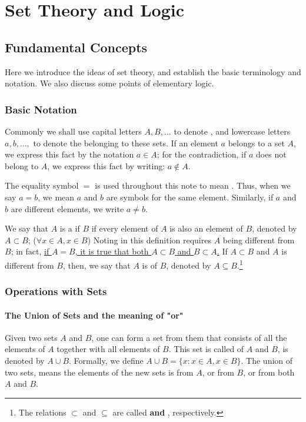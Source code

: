 \section{Set Theory and Logic}

\subsection{Fundamental Concepts}

Here we introduce the ideas of set theory, and establish the basic terminology and notation. We also discuss some points of elementary logic.

\subsubsection{Basic Notation}

Commonly we shall use capital letters $A, B, \dots$ to denote \textbf{}, and lowercase letters $a, b, \dots,$ to denote the \textbf{} belonging to these sets. If an element $a$ belongs to a set $A$, we  express this fact by the notation $a \in A$; for the contradiction, if $a$ does not belong to $A$, we express this fact by writing: $a \not\in A$. 

The equality symbol $=$ is used throughout this note to mean . Thus, when we say $a = b$, we mean $a$ and $b$ are symbols for the same element. Similarly, if $a$ and $b$ are different elements, we write $a \neq b$.

We say that $A$ is a \textbf{} if $B$ if every element of $A$ is also an element of $B$, denoted by $A \subset B$; ($\forall x \in A, x \in B$) Noting in this definition requires $A$ being different from $B$; in fact, \uline{if $A = B$, it is true that both $A \subset B$ and $B \subset A$.} If $A \subset B$ and $A$ is different from $B$, then, we say that $A$ is \textbf{} of $B$, denoted by $A \subseteq B$.\footnote{The relations $\subset$ and $\subseteq$ are called \textbf{ and }, respectively.}

\subsubsection{Operations with Sets}

\paragraph{The Union of Sets and the meaning of "or"} Given two sets $A$ and $B$, one can form a set from them that consists of all the elements of $A$ together with all elements of $B$. This set is called \textbf{} of $A$ and $B$, is denoted by $A \cup B$. Formally, we define $A \cup B = \{x: x\in A, x \in B\}$. The union of two sets, means the elements of the new sets is from $A$, or from $B$, or from both $A$ and $B$.

